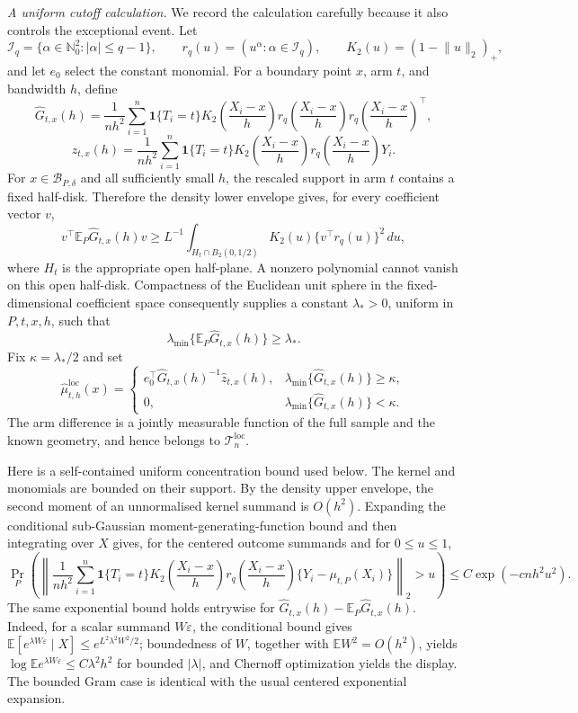 \emph{A uniform cutoff calculation.}
We record the calculation carefully because it also controls the exceptional event.  Let
\[
 \mathcal I_q=\{\alpha\in\mathbb N_0^2:|\alpha|\leq q-1\},
 \qquad r_q(u)=(u^\alpha: \alpha\in\mathcal I_q),
 \qquad K_2(u)=(1-\lVert u\rVert_2)_+,
\]
and let \(e_0\) select the constant monomial.  For a boundary point \(x\), arm \(t\), and bandwidth \(h\), define
\[
 \widehat G_{t,x}(h)=\frac1{nh^2}\sum_{i=1}^n
 \mathbf 1\{T_i=t\}K_2\!\left(\frac{X_i-x}{h}\right)
 r_q\!\left(\frac{X_i-x}{h}\right)r_q\!\left(\frac{X_i-x}{h}\right)^{\!\top},
\]
\[
 \widehat z_{t,x}(h)=\frac1{nh^2}\sum_{i=1}^n
 \mathbf 1\{T_i=t\}K_2\!\left(\frac{X_i-x}{h}\right)
 r_q\!\left(\frac{X_i-x}{h}\right)Y_i.
\]
For \(x\in\mathcal B_{P,\delta}\) and all sufficiently small \(h\), the rescaled support in arm \(t\) contains a fixed half-disk.  Therefore the density lower envelope gives, for every coefficient vector \(v\),
\[
 v^\top\mathbb E_P\widehat G_{t,x}(h)v
 \geq L^{-1}\int_{H_t\cap B_2(0,1/2)}
 K_2(u)\{v^\top r_q(u)\}^2\,du,
\]
where \(H_t\) is the appropriate open half-plane.  A nonzero polynomial cannot vanish on this open half-disk.  Compactness of the Euclidean unit sphere in the fixed-dimensional coefficient space consequently supplies a constant \(\lambda_*>0\), uniform in \(P,t,x,h\), such that
\[
 \lambda_{\min}\{\mathbb E_P\widehat G_{t,x}(h)\}\geq\lambda_*.
\]
Fix \(\kappa=\lambda_*/2\) and set
\[
 \widehat\mu^{\mathrm{loc}}_{t,h}(x)=
 \begin{cases}
 e_0^\top\widehat G_{t,x}(h)^{-1}\widehat z_{t,x}(h),
 &\lambda_{\min}\{\widehat G_{t,x}(h)\}\geq\kappa,\\
 0,&\lambda_{\min}\{\widehat G_{t,x}(h)\}<\kappa.
 \end{cases}
\]
The arm difference is a jointly measurable function of the full sample and the known geometry, and hence belongs to \(\mathcal T_n^{\mathrm{loc}}\).

Here is a self-contained uniform concentration bound used below.  The kernel and monomials are bounded on their support.  By the density upper envelope, the second moment of an unnormalised kernel summand is \(O(h^2)\).  Expanding the conditional sub-Gaussian moment-generating-function bound and then integrating over \(X\) gives, for the centered outcome summands and for \(0\leq u\leq1\),
\[
 \Pr_P\!\left(
 \left\lVert\frac1{nh^2}\sum_{i=1}^n
 \mathbf 1\{T_i=t\}K_2\!\left(\frac{X_i-x}{h}\right)
 r_q\!\left(\frac{X_i-x}{h}\right)
 \{Y_i-\mu_{t,P}(X_i)\}\right\rVert_2>u
 \right)
 \leq C\exp(-cnh^2u^2).
\]
The same exponential bound holds entrywise for \(\widehat G_{t,x}(h)-\mathbb E_P\widehat G_{t,x}(h)\).  Indeed, for a scalar summand \(W\varepsilon\), the conditional bound gives \(\mathbb E[e^{\lambda W\varepsilon}\mid X]\leq e^{L^2\lambda^2W^2/2}\); boundedness of \(W\), together with \(\mathbb E W^2=O(h^2)\), yields \(\log\mathbb E e^{\lambda W\varepsilon}\leq C\lambda^2h^2\) for bounded \(|\lambda|\), and Chernoff optimization yields the display.  The bounded Gram case is identical with the usual centered exponential expansion.

